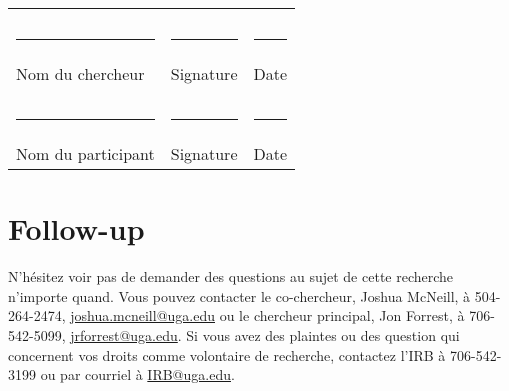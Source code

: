 \documentclass{article}
\begin{document}
      \noindent\begin{tabular}{l l l}
                                       &                              & \\
                                       &                              & \\
        \rule{0.35\textwidth}{0.4pt}   & \rule{0.35\textwidth}{0.4pt} & \rule{0.2\textwidth}{0.4pt} \\
        Nom du chercheur               & Signature                    & Date \\
                                       &                              & \\
                                       &                              & \\
        \rule{0.35\textwidth}{0.4pt}   & \rule{0.35\textwidth}{0.4pt} & \rule{0.2\textwidth}{0.4pt} \\
        Nom du participant             & Signature                    & Date \\
      \end{tabular}

    \section{Follow-up}
      N'hésitez voir pas de demander des questions au sujet de cette recherche n'importe quand.
      Vous pouvez contacter le co-chercheur, Joshua McNeill, à 504-264-2474, \href{mailto:joshua.mcneill@uga.edu}{joshua.mcneill@uga.edu} ou le chercheur principal, Jon Forrest, à 706-542-5099, \href{mailto:jrforrest@uga.edu}{jrforrest@uga.edu}.
      Si vous avez des plaintes ou des question qui concernent vos droits comme volontaire de recherche, contactez l'IRB à 706-542-3199 ou par courriel à \href{mailto:IRB@uga.edu}{IRB@uga.edu}.
  
\end{document}
